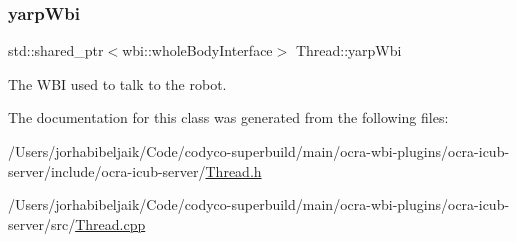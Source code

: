 \subsubsection{\texorpdfstring{yarp\+Wbi}{yarpWbi}}
{\footnotesize\ttfamily std\+::shared\+\_\+ptr$<$wbi\+::whole\+Body\+Interface$>$ Thread\+::yarp\+Wbi\hspace{0.3cm}{\ttfamily [private]}}

The W\+BI used to talk to the robot. 

The documentation for this class was generated from the following files\+:\begin{DoxyCompactItemize}
\item 
/\+Users/jorhabibeljaik/\+Code/codyco-\/superbuild/main/ocra-\/wbi-\/plugins/ocra-\/icub-\/server/include/ocra-\/icub-\/server/\hyperlink{Thread_8h}{Thread.\+h}\item 
/\+Users/jorhabibeljaik/\+Code/codyco-\/superbuild/main/ocra-\/wbi-\/plugins/ocra-\/icub-\/server/src/\hyperlink{Thread_8cpp}{Thread.\+cpp}\end{DoxyCompactItemize}
